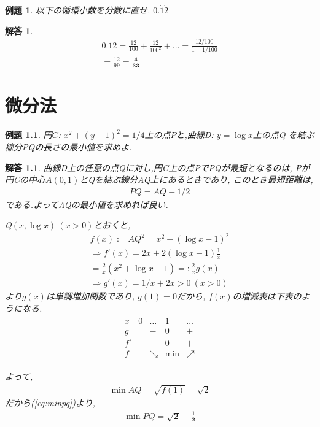 \documentclass[a4paper,11pt,twocolumn]{jsbook}
\newtheorem{example}{例題}[section]
\newtheorem*{solution}{解答}
\begin{document}
\begin{screen}
  \begin{example}
    以下の循環小数を分数に直せ.
    $0.\dot{1}\dot{2}$
  \end{example}
\end{screen}
\begin{solution}
  \begin{eqnarray}
    0.\dot{1}\dot{2} = \frac{12}{100} + \frac{12}{100^2} + \dots 
    = \frac{12/100}{1-1/100} \nonumber \\
    = \frac{12}{99} = \bm{\frac{4}{33}} \nonumber
  \end{eqnarray}
\end{solution}


\chapter{微分法}

\begin{screen}
  \begin{example}
    円$C$: $x^2+(y-1)^2=1/4$上の点$P$と,曲線D: $y=\log x$上の点Q
    を結ぶ線分PQの長さの最小値を求めよ.
  \end{example}
\end{screen}
\begin{solution}
  曲線D上の任意の点Qに対し,円C上の点PでPQが最短となるのは,
  Pが円Cの中心$A(0,1)$とQを結ぶ線分AQ上にあるときであり,
  このとき最短距離は,
  \begin{eqnarray}
    PQ = AQ - 1/2
    \label{eq:minpq}
  \end{eqnarray}
  である.よってAQの最小値を求めれば良い.

  Q$(x,\log x)\ (x>0)$とおくと,
  \begin{eqnarray}
    f(x) := AQ^2
    = x^2 + (\log x - 1)^2 \nonumber \\
    \Rightarrow f'(x) = 2x + 2(\log x - 1)\frac{1}{x} \nonumber \\
    = \frac{2}{x} (x^2 + \log x - 1) 
    =: \frac{2}{x} g(x) \nonumber \\
    \Rightarrow g'(x) = 1/x + 2x > 0 \ (x>0) \nonumber
  \end{eqnarray}
  より$g(x)$は単調増加関数であり, $g(1) = 0$だから,
  $f(x)$の増減表は下表のようになる.
  \begin{eqnarray}
    \begin{array}{c|cccc}
      x & 0 & \dots & 1 & \dots \\ \hline
      g && - & 0 & + \\
      f' && - & 0 & + \\
      f && \searrow & \min & \nearrow \nonumber
    \end{array}
  \end{eqnarray}

  よって,
  \begin{eqnarray}
    \min AQ = \sqrt{f(1)} = \sqrt{2} \nonumber 
  \end{eqnarray}
  だから(\ref{eq:minpq})より,
  \begin{eqnarray}
    \min PQ = \bm{\sqrt{2} - \frac{1}{2}} \nonumber
  \end{eqnarray}
\end{solution}
\end{document}
